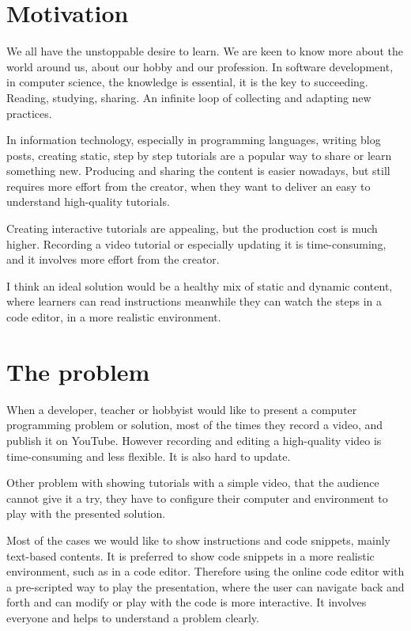 \documentclass[12pt, a4paper, oneside, openright, medskipamount]{report}
\begin{document}
\section{Motivation}

We all have the unstoppable desire to learn. We are keen to know more about the world around us, about our hobby and our profession. In software development, in computer science, the knowledge is essential, it is the key to succeeding. Reading, studying, sharing. An infinite loop of collecting and adapting new practices.

In information technology, especially in programming languages, writing blog posts, creating static, step by step tutorials are a popular way to share or learn something new. Producing and sharing the content is easier nowadays, but still requires more effort from the creator, when they want to deliver an easy to understand high-quality tutorials.

Creating interactive tutorials are appealing, but the production cost is much higher. Recording a video tutorial or especially updating it is time-consuming, and it involves more effort from the creator.

I think an ideal solution would be a healthy mix of static and dynamic content, where learners can read instructions meanwhile they can watch the steps in a code editor, in a more realistic environment.

\section{The problem}

When a developer, teacher or hobbyist would like to present a computer programming problem or solution, most of the times they record a video, and publish it on YouTube. However recording and editing a high-quality video is time-consuming and less flexible. It is also hard to update.

Other problem with showing tutorials with a simple video, that the audience cannot give it a try, they have to configure their computer and environment to play with the presented solution.

Most of the cases we would like to show instructions and code snippets, mainly text-based contents. It is preferred to show code snippets in a more realistic environment, such as in a code editor. Therefore using the online code editor with a pre-scripted way to play the presentation, where the user can navigate back and forth and can modify or play with the code is more interactive. It involves everyone and helps to understand a problem clearly.
\end{document}
